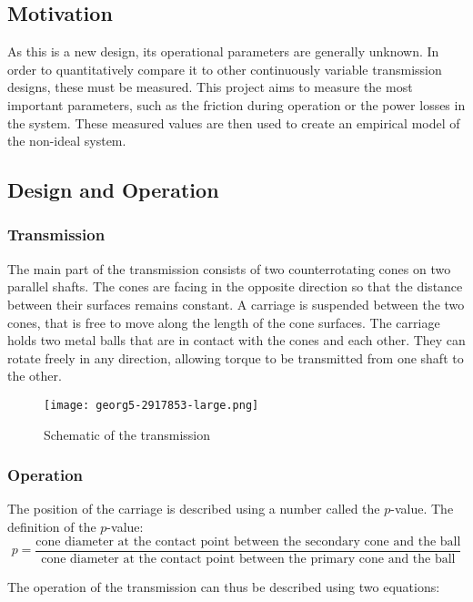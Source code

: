 \documentclass[12pt]{article}
\begin{document}
\subsection{Motivation}
As this is a new design, its operational parameters are generally unknown. In order to quantitatively compare it to other continuously variable transmission designs, these must be measured. This project aims to measure the most important parameters, such as the friction during operation or the power losses in the system. These measured values are then used to create an empirical model of the non-ideal system. 


\subsection{Design and Operation}

\subsubsection{Transmission}
The main part of the transmission consists of two counterrotating cones on two parallel shafts. The cones are facing in the opposite direction so that the distance between their surfaces remains constant. A carriage is suspended between the two cones, that is free to move along the length of the cone surfaces. The carriage holds two metal balls that are in contact with the cones and each other. They can rotate freely in any direction, allowing torque to be transmitted from one shaft to the other.

\begin{figure}[h]
    \centering
    \texttt{[image: georg5-2917853-large.png]}
    \caption{Schematic of the transmission}
    \label{fig:transmissionSchematic}
\end{figure}

\subsubsection{Operation}
The position of the carriage is described using a number called the $p$-value. The definition of the $p$-value:
$$p=\frac{\text{cone diameter at the contact point between the secondary cone and the ball}}{\text{cone diameter at the contact point between the primary cone and the ball}}$$ 



The operation of the transmission can thus be described using two equations:
\end{document}
